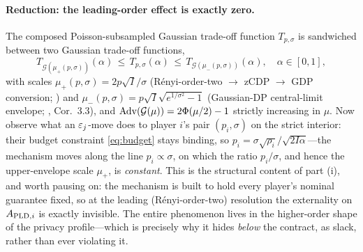 
\paragraph{Reduction: the leading-order effect is exactly zero.} The
composed Poisson-subsampled Gaussian trade-off function
$T_{p,\sigma}$ is sandwiched between two Gaussian trade-off functions,
\[
T_{\mathcal G(\mu_+(p,\sigma))}(\alpha) \,\leq\, T_{p,\sigma}(\alpha)
   \,\leq\, T_{\mathcal G(\mu_-(p,\sigma))}(\alpha),
\quad \alpha \in [0,1],
\]
with scales $\mu_+(p,\sigma) = 2p\sqrt{I}/\sigma$ (R\'enyi-order-two
$\to$ zCDP $\to$ GDP conversion; \cite{mironov2017renyi,
bun2016concentrated}) and $\mu_-(p,\sigma) =
p\sqrt{I}\sqrt{e^{1/\sigma^2}-1}$ (Gaussian-DP central-limit
envelope; \cite{dong2022gaussian}, Cor.~3.3), and $\mathrm{Adv}(\mathcal
G(\mu)) = 2\Phi(\mu/2)-1$ strictly increasing in $\mu$. Now observe
what an $\varepsilon_j$-move does to player $i$'s pair $(p_i, \sigma)$ on the
strict interior: their budget constraint \eqref{eq:budget} stays binding, so $p_i =
\sigma\sqrt{\rho_i}/\sqrt{2I\alpha}$---the mechanism moves along the
line $p_i \propto \sigma$, on which the ratio $p_i/\sigma$, and hence
the upper-envelope scale $\mu_+$, is \emph{constant}. This is the
structural content of part (i), and worth pausing on: the mechanism
is built to hold every player's nominal guarantee fixed, so at the
leading (R\'enyi-order-two) resolution the externality on $A_{\mathrm{PLD},i}$ is
exactly invisible. The entire phenomenon lives in the higher-order
shape of the privacy profile---which is precisely why it hides
\emph{below} the contract, as slack, rather than ever violating it.

